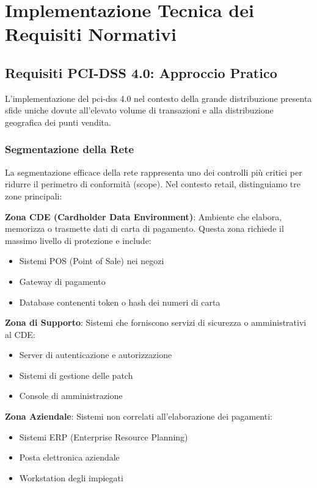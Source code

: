 \section{Implementazione Tecnica dei Requisiti Normativi}
\label{sec:4.4_implementazione}

\subsection{Requisiti PCI-DSS 4.0: Approccio Pratico}
\label{subsec:4.4.1_pcidss}

L'implementazione del \gls{pci-dss} 4.0 nel contesto della grande distribuzione presenta sfide uniche dovute all'elevato volume di transazioni e alla distribuzione geografica dei punti vendita.

\subsubsection{Segmentazione della Rete}

La segmentazione efficace della rete rappresenta uno dei controlli più critici per ridurre il perimetro di conformità (scope). Nel contesto retail, distinguiamo tre zone principali:

\textbf{Zona CDE (Cardholder Data Environment)}: Ambiente che elabora, memorizza o trasmette dati di carta di pagamento. Questa zona richiede il massimo livello di protezione e include:
\begin{itemize}
    \item Sistemi POS (Point of Sale) nei negozi
    \item Gateway di pagamento
    \item Database contenenti token o hash dei numeri di carta
\end{itemize}

\textbf{Zona di Supporto}: Sistemi che forniscono servizi di sicurezza o amministrativi al CDE:
\begin{itemize}
    \item Server di autenticazione e autorizzazione
    \item Sistemi di gestione delle patch
    \item Console di amministrazione
\end{itemize}

\textbf{Zona Aziendale}: Sistemi non correlati all'elaborazione dei pagamenti:
\begin{itemize}
    \item Sistemi ERP (Enterprise Resource Planning)
    \item Posta elettronica aziendale
    \item Workstation degli impiegati
\end{itemize}

